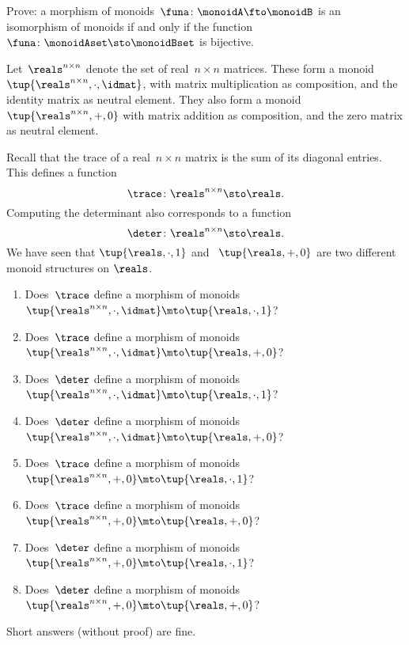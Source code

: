 \begin{gradedexercise}
    Prove: a morphism of monoids~$\funa\colon \monoidA \fto \monoidB$ is an isomorphism of monoids if and only if the function~$\funa\colon \monoidAset \sto \monoidBset$ is bijective.
\end{gradedexercise}



\begin{gradedexercise}
    \label{ex:TraceAndDeterminant}
    Let~$\reals^{n \times n}$ denote the set of real~$n \times n$ matrices.
These form a monoid~$\tup{\reals^{n \times n}, \cdot, \idmat}$, with matrix multiplication as composition, and the identity matrix as neutral element.
They also form a monoid $\tup{\reals^{n \times n}, + , 0}$ with matrix addition as composition, and the zero matrix as neutral element.
    
    Recall that the trace of a real~$n \times n$ matrix is the sum of its diagonal entries.
This defines a function
    \begin{equation}
        \trace \colon \reals^{n \times n} \sto \reals.
    \end{equation}
    Computing the determinant also corresponds to a function
    \begin{equation}
        \deter \colon \reals^{n \times n} \sto \reals.
    \end{equation}
    We have seen that $\tup{ \reals, \cdot, 1}$ and ~$\tup{ \reals, +, 0}$ are two different monoid structures on $\reals$.
    \begin{enumerate}
        \item Does~$\trace$ define a morphism of monoids~$\tup{\reals^{n \times n}, \cdot, \idmat} \mto \tup{ \reals, \cdot, 1}$?
        \item Does~$\trace$ define a morphism of monoids~$\tup{\reals^{n \times n}, \cdot, \idmat} \mto \tup{ \reals, + , 0}$?
        \item Does~$\deter$ define a morphism of monoids~$\tup{\reals^{n \times n}, \cdot, \idmat} \mto \tup{ \reals, \cdot, 1}$?
        \item Does~$\deter$ define a morphism of monoids~$\tup{\reals^{n \times n}, \cdot, \idmat} \mto \tup{ \reals, + , 0}$?
        \item Does~$\trace$ define a morphism of monoids~$\tup{\reals^{n \times n}, +, 0} \mto \tup{ \reals, \cdot, 1}$?
        \item Does~$\trace$ define a morphism of monoids~$\tup{\reals^{n \times n}, +, 0} \mto \tup{ \reals, + , 0}$?
        \item Does~$\deter$ define a morphism of monoids~$\tup{\reals^{n \times n}, +, 0} \mto \tup{ \reals, \cdot, 1}$?
        \item Does~$\deter$ define a morphism of monoids~$\tup{\reals^{n \times n}, +, 0} \mto \tup{ \reals, + , 0}$?
    \end{enumerate}
    Short answers (without proof) are fine.
\end{gradedexercise}


